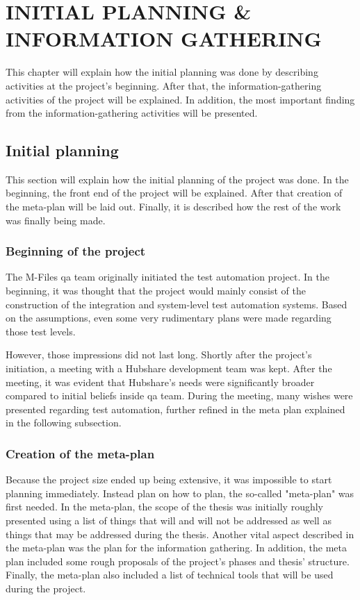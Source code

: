 \chapter{INITIAL PLANNING \& INFORMATION GATHERING}\label{chapter:initial_planning_and_information_gathering}
This chapter will explain how the initial planning was done by describing activities at the project's beginning. After that, the information-gathering activities of the project will be explained. In addition, the most important finding from the information-gathering activities will be presented.

\section{Initial planning}
This section will explain how the initial planning of the project was done. In the beginning, the front end of the project will be explained. After that creation of the meta-plan will be laid out. Finally, it is described how the rest of the work was finally being made.

\subsection{Beginning of the project}\label{subsection:beginning_of_the_project}
The M-Files \gls{qa} team originally initiated the test automation project. In the beginning, it was thought that the project would mainly consist of the construction of the integration and system-level test automation systems. Based on the assumptions, even some very rudimentary plans were made regarding those test levels.

However, those impressions did not last long. Shortly after the project's initiation, a meeting with a Hubshare development team was kept. After the meeting, it was evident that Hubshare's needs were significantly broader compared to initial beliefs inside \gls{qa} team. During the meeting, many wishes were presented regarding test automation, further refined in the meta plan explained in the following subsection.

\subsection{Creation of the meta-plan}
Because the project size ended up being extensive, it was impossible to start planning immediately. Instead plan on how to plan, the so-called "meta-plan" was first needed. In the meta-plan, the scope of the thesis was initially roughly presented using a list of things that will and will not be addressed as well as things that may be addressed during the thesis. Another vital aspect described in the meta-plan was the plan for the information gathering. In addition, the meta plan included some rough proposals of the project's phases and thesis' structure. Finally, the meta-plan also included a list of technical tools that will be used during the project.

